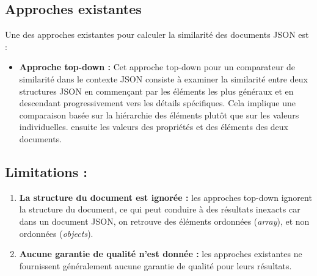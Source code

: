         \subsection{Approches existantes}
            Une des approches existantes pour calculer la similarité des documents JSON est :
            \begin{itemize}
                \item [\textbullet] \textbf{Approche top-down \cite{JSON_Similarity}:} 
            Cet approche top-down pour un comparateur de similarité dans le contexte JSON consiste à examiner la similarité entre deux structures JSON en commençant par les éléments les plus généraux et en descendant progressivement vers les détails spécifiques. Cela implique une comparaison basée sur la hiérarchie des éléments plutôt que sur les valeurs individuelles. ensuite les valeurs des propriétés et des éléments des deux documents.
            \end{itemize}
        \subsection{Limitations :}
            \begin{enumerate}
                \item \textbf{La structure du document est ignorée :} les approches top-down ignorent la structure du document, ce qui peut conduire à des résultats inexacts car dans un document JSON, on retrouve des éléments ordonnées (\emph{array}), et non ordonnées (\emph{objects}).
                \item \textbf{Aucune garantie de qualité n'est donnée :} les approches existantes ne fournissent généralement aucune garantie de qualité pour leurs résultats.
            \end{enumerate}

